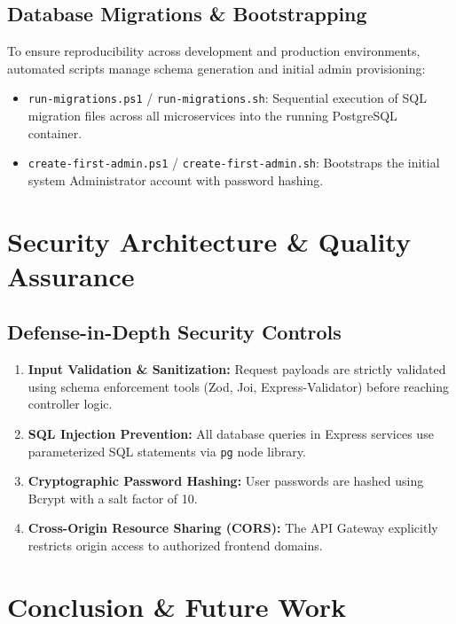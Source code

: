 \documentclass[12pt, a4paper]{report}
\begin{document}
\section{Database Migrations \& Bootstrapping}
To ensure reproducibility across development and production environments, automated scripts manage schema generation and initial admin provisioning:
\begin{itemize}
    \item \texttt{run-migrations.ps1} / \texttt{run-migrations.sh}: Sequential execution of SQL migration files across all microservices into the running PostgreSQL container.
    \item \texttt{create-first-admin.ps1} / \texttt{create-first-admin.sh}: Bootstraps the initial system Administrator account with password hashing.
\end{itemize}

\chapter{Security Architecture \& Quality Assurance}

\section{Defense-in-Depth Security Controls}
\begin{enumerate}
    \item \textbf{Input Validation \& Sanitization:} Request payloads are strictly validated using schema enforcement tools (Zod, Joi, Express-Validator) before reaching controller logic.
    \item \textbf{SQL Injection Prevention:} All database queries in Express services use parameterized SQL statements via \texttt{pg} node library.
    \item \textbf{Cryptographic Password Hashing:} User passwords are hashed using Bcrypt with a salt factor of 10.
    \item \textbf{Cross-Origin Resource Sharing (CORS):} The API Gateway explicitly restricts origin access to authorized frontend domains.
\end{enumerate}

\chapter{Conclusion \& Future Work}
\end{document}
